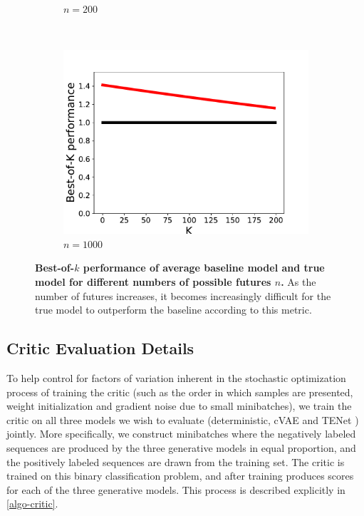 \documentclass{article}
\newcommand{\modelname}{TENet }
\begin{document}
\begin{appendices}
\begin{figure}
\begin{subfigure}[b]{0.3\textwidth}
    \caption{$n=200$}
    \label{fig:tiger}
  \end{subfigure}
  ~ %
  \begin{subfigure}[b]{0.3\textwidth}
    \includegraphics[width=\textwidth]{images/best_of_k_toy_n1000.pdf}
    \caption{$n=1000$}
    \label{fig:mouse}
  \end{subfigure}
  \caption{
    \textbf{Best-of-$k$ performance of average baseline model and true model for different numbers of possible futures $n$.}
    As the number of futures increases, it becomes increasingly difficult for the true model to outperform the baseline according to this metric.}
  \label{expected-loss}
\end{figure}

\subsection{Critic Evaluation Details}
\label{critic-details}

To help control for factors of variation inherent in the stochastic optimization process of training the critic (such as the order in which samples are presented, weight initialization and gradient noise due to small minibatches), we train the critic on all three models we wish to evaluate (deterministic, cVAE and \modelname) jointly.
More specifically, we construct minibatches where the negatively labeled sequences are produced by the three generative models in equal proportion, and the positively labeled sequences are drawn from the training set.
The critic is trained on this binary classification problem, and after training produces scores for each of the three generative models.
This process is described explicitly in \cref{algo-critic}.


\end{appendices}
\end{document}
